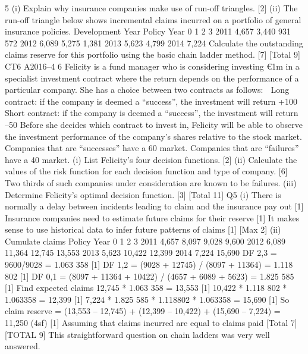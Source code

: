\documentclass[a4paper,12pt]{article}
\begin{document}
\begin{enumerate}
5 (i) Explain why insurance companies make use of run-off triangles. [2]
(ii) The run-off triangle below shows incremental claims incurred on a portfolio of
general insurance policies.
Development Year
Policy Year 0 1 2 3
2011 4,657 3,440 931 572
2012 6,089 5,275 1,381
2013 5,623 4,799
2014 7,224
Calculate the outstanding claims reserve for this portfolio using the basic
chain ladder method. [7]
[Total 9]
CT6 A2016–4
6 Felicity is a fund manager who is considering investing €1m in a specialist
investment contract where the return depends on the performance of a particular
company. She has a choice between two contracts as follows:
   Long contract: if the company is deemed a “success”, the investment will return
+100%
 Short contract: if the company is deemed a “success”, the investment will return
–50%
Before she decides which contract to invest in, Felicity will be able to observe the
investment performance of the company’s shares relative to the stock market.
Companies that are “successes” have a 60%
market. Companies that are “failures” have a 40%
market.
(i) List Felicity’s four decision functions. [2]
(ii) Calculate the values of the risk function for each decision function and type
of company. [6]
Two thirds of such companies under consideration are known to be failures.
(iii) Determine Felicity’s optimal decision function. [3]
[Total 11]
  Q5 (i) There is normally a delay between incidents leading to claim and the insurance
pay out [1]
Insurance companies need to estimate future claims for their reserve [1]
It makes sense to use historical data to infer future patterns of claims [1]
[Max 2]
(ii) Cumulate claims
Policy
Year
0 1 2 3
2011 4,657 8,097 9,028 9,600
2012 6,089 11,364 12,745 13,553
2013 5,623 10,422 12,399
2014 7,224 15,690
DF 2,3 = 9600/9028 = 1.063 358 [1]
DF 1,2 = (9028 + 12745) / (8097 + 11364) = 1.118 802 [1]
DF 0,1 = (8097 + 11364 + 10422) / (4657 + 6089 + 5623) = 1.825 585 [1]
Find expected claims 12,745 * 1.063 358 = 13,553 [1]
10,422 * 1.118 802 * 1.063358 = 12,399 [1]
7,224 * 1.825 585 * 1.118802 * 1.063358 = 15,690 [1]
So claim reserve =
  (13,553 – 12,745) + (12,399 – 10,422) + (15,690 – 7,224) = 11,250 (4sf) [1]
Assuming that claims incurred are equal to claims paid
[Total 7]
[TOTAL 9]
This straightforward question on chain ladders was very well answered.

\end{enumerate}
\end{document}
